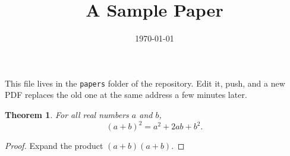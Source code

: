 \documentclass{article}
\title{A Sample Paper}
\author{}
\date{\today}
\newtheorem{theorem}{Theorem}
\begin{document}
\maketitle

This file lives in the \texttt{papers} folder of the repository. Edit it,
push, and a new PDF replaces the old one at the same address a few minutes
later.

\begin{theorem}
For all real numbers $a$ and $b$,
\[
  (a+b)^2 = a^2 + 2ab + b^2 .
\]
\end{theorem}

\begin{proof}
Expand the product $(a+b)(a+b)$.
\end{proof}
\end{document}
